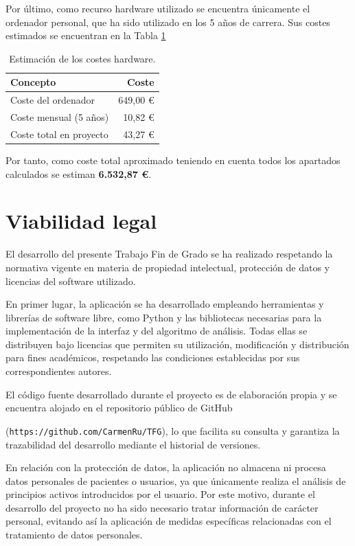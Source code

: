 Por último, como recurso hardware utilizado se encuentra únicamente el ordenador personal, que ha sido utilizado en los 5 años de carrera. Sus costes estimados se encuentran en la Tabla \ref{tab:hardware}
\begin{table}[htbp]
\centering
\caption{Estimación de los costes hardware.}
\label{tab:hardware}
\begin{tabular}{lr}
\toprule
\textbf{Concepto} & \textbf{Coste} \\
\midrule
Coste del ordenador & 649,00 € \\
Coste mensual (5 años) & 10,82 € \\
Coste total en proyecto & 43,27 € \\

\bottomrule
\end{tabular}
\end{table}

Por tanto, como coste total aproximado teniendo en cuenta todos los apartados calculados se estiman \textbf{6.532,87 €}.

\section{Viabilidad legal}

El desarrollo del presente Trabajo Fin de Grado se ha realizado respetando la normativa vigente en materia de propiedad intelectual, protección de datos y licencias del software utilizado.

En primer lugar, la aplicación se ha desarrollado empleando herramientas y librerías de software libre, como Python y las bibliotecas necesarias para la implementación de la interfaz y del algoritmo de análisis. Todas ellas se distribuyen bajo licencias que permiten su utilización, modificación y distribución para fines académicos, respetando las condiciones establecidas por sus correspondientes autores.

El código fuente desarrollado durante el proyecto es de elaboración propia y se encuentra alojado en el repositorio público de GitHub 

(\texttt{https://github.com/CarmenRu/TFG}), lo que facilita su consulta y garantiza la trazabilidad del desarrollo mediante el historial de versiones.

En relación con la protección de datos, la aplicación no almacena ni procesa datos personales de pacientes o usuarios, ya que únicamente realiza el análisis de principios activos introducidos por el usuario. Por este motivo, durante el desarrollo del proyecto no ha sido necesario tratar información de carácter personal, evitando así la aplicación de medidas específicas relacionadas con el tratamiento de datos personales.

